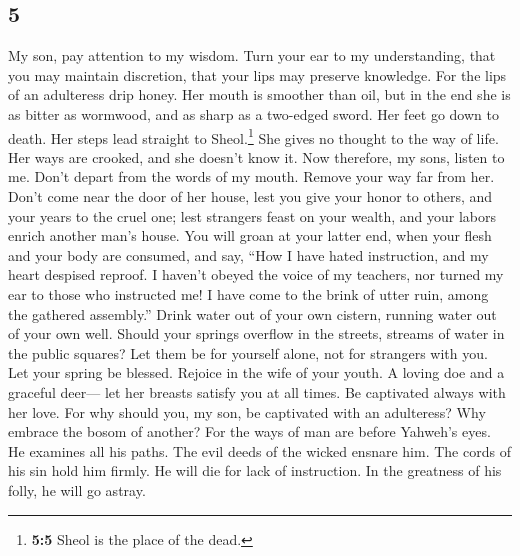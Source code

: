 \begin{paracol}{2}
\begin{otherlanguage}{english}
\hypertarget{section-9}{%
\section{5}\label{section-9}}

 My son, pay attention to my wisdom. Turn your ear to my
understanding,  that you may maintain discretion, that
your lips may preserve knowledge.  For the lips of an
adulteress drip honey. Her mouth is smoother than oil, 
but in the end she is as bitter as wormwood, and as sharp as a two-edged
sword.  Her feet go down to death. Her steps lead straight
to Sheol.\footnote{\textbf{5:5} Sheol is the place of the dead.}
 She gives no thought to the way of life. Her ways are
crooked, and she doesn't know it.  Now therefore, my sons,
listen to me. Don't depart from the words of my mouth. 
Remove your way far from her. Don't come near the door of her house,
 lest you give your honor to others, and your years to the
cruel one;  lest strangers feast on your wealth, and your
labors enrich another man's house.  You will groan at
your latter end, when your flesh and your body are consumed,
 and say, ``How I have hated instruction, and my heart
despised reproof.  I haven't obeyed the voice of my
teachers, nor turned my ear to those who instructed me! 
I have come to the brink of utter ruin, among the gathered assembly.''
 Drink water out of your own cistern, running water out
of your own well.  Should your springs overflow in the
streets, streams of water in the public squares?  Let
them be for yourself alone, not for strangers with you. 
Let your spring be blessed. Rejoice in the wife of your youth.
 A loving doe and a graceful deer--- let her breasts
satisfy you at all times. Be captivated always with her love.
 For why should you, my son, be captivated with an
adulteress? Why embrace the bosom of another?  For the
ways of man are before Yahweh's eyes. He examines all his paths.
 The evil deeds of the wicked ensnare him. The cords of
his sin hold him firmly.  He will die for lack of
instruction. In the greatness of his folly, he will go astray.

\end{otherlanguage}


\end{paracol}
